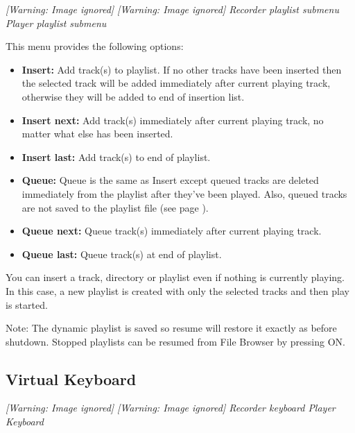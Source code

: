 {\centering\itshape
  [Warning: Image ignored] %
     [Warning: Image ignored] %
 \newline
  Recorder playlist submenu  Player playlist submenu
\par}

This menu provides the following options:

\begin{itemize}
\item \textbf{Insert:} Add track(s) to playlist. If no other tracks have been
inserted then the selected track will be added immediately after
current playing track, otherwise they will be added to end of insertion
list.
\item \textbf{Insert next: }Add track(s) immediately after current playing
track, no matter what else has been inserted.
\item \textbf{Insert last: }Add track(s) to end of playlist.
\item \textbf{Queue: } Queue is the same as Insert except queued
tracks are deleted immediately from the playlist after
they've been played. Also, queued tracks are not saved to the playlist file (see page \pageref{ref:playlistoptions}).
\item \textbf{Queue next:} Queue track(s) immediately after current playing
track.
\item \textbf{Queue last: }Queue track(s) at end of playlist.
\end{itemize}

You can insert a track, directory or playlist even if nothing is
currently playing. In this case, a new playlist is created with only
the selected tracks and then play is started.

Note: The dynamic playlist is saved so resume will restore it exactly as
before shutdown. Stopped playlists can be resumed from File Browser by
pressing ON.




\subsection{Virtual Keyboard}
{\centering\itshape
  [Warning: Image ignored] %
 \textmd{  }  [Warning: Image ignored]
 \newline
  Recorder keyboard  Player Keyboard  
\par}

